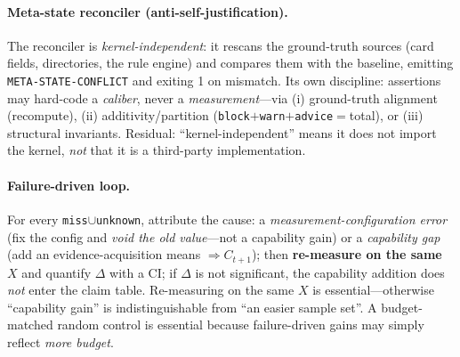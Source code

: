 \documentclass{article}
\begin{document}
\paragraph{Meta-state reconciler (anti-self-justification).}
\label{sec:reconciler}
The reconciler is \emph{kernel-independent}: it rescans the ground-truth sources (card fields,
directories, the rule engine) and compares them with the baseline, emitting
\texttt{META-STATE-CONFLICT} and exiting 1 on mismatch. Its own discipline: assertions may
hard-code a \emph{caliber}, never a \emph{measurement}---via (i) ground-truth alignment
(recompute), (ii) additivity/partition (\texttt{block}$+$\texttt{warn}$+$\texttt{advice}$=$total),
or (iii) structural invariants. Residual: ``kernel-independent'' means it does not import the
kernel, \emph{not} that it is a third-party implementation.

\paragraph{Failure-driven loop.} For every \texttt{miss}$\cup$\texttt{unknown}, attribute the
cause: a \emph{measurement-configuration error} (fix the config and \emph{void the old value}---not
a capability gain) or a \emph{capability gap} (add an evidence-acquisition means $\Rightarrow
C_{t+1}$); then \textbf{re-measure on the same $X$} and quantify $\Delta$ with a CI; if $\Delta$ is
not significant, the capability addition does \emph{not} enter the claim table. Re-measuring on the
same $X$ is essential---otherwise ``capability gain'' is indistinguishable from ``an easier sample
set''. A budget-matched random control is essential because failure-driven gains may simply reflect
\emph{more budget}.
\end{document}
